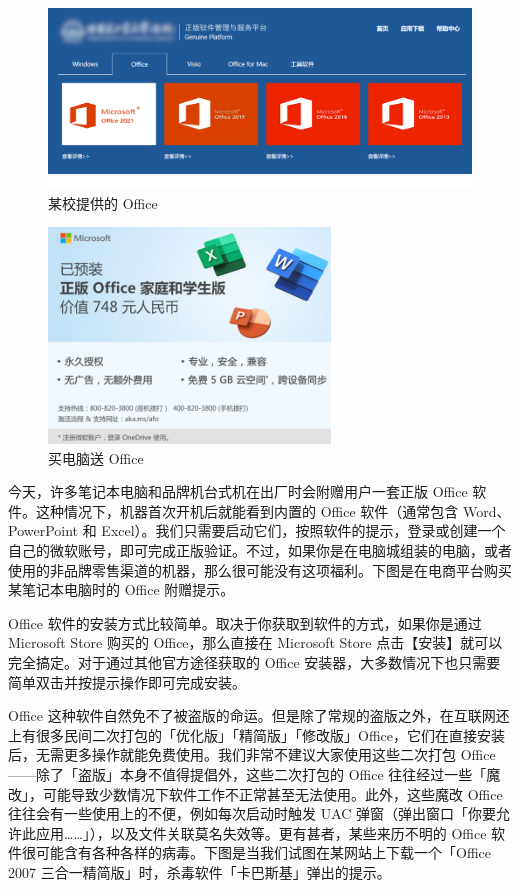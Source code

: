 \begin{figure}[htb!]
  \centering
  \includegraphics[width=12cm]{assets/software/Geniune_platform.png}
  \caption{某校提供的 Office}
  \label{fig:Geniune_platform}
\end{figure}

\begin{figure}[htb!]
  \centering
  \includegraphics[width=7.5cm]{assets/software/Preinstalled_Office.png}
  \caption{买电脑送 Office}
  \label{fig:Preinstalled_Office}
\end{figure}

今天，许多笔记本电脑和品牌机台式机在出厂时会附赠用户一套正版 Office 软件。这种情况下，机器首次开机后就能看到内置的 Office 软件（通常包含 Word、PowerPoint 和 Excel）。我们只需要启动它们，按照软件的提示，登录或创建一个自己的微软账号，即可完成正版验证。不过，如果你是在电脑城组装的电脑，或者使用的非品牌零售渠道的机器，那么很可能没有这项福利。下图是在电商平台购买某笔记本电脑时的 Office 附赠提示。

Office 软件的安装方式比较简单。取决于你获取到软件的方式，如果你是通过 Microsoft Store 购买的 Office，那么直接在 Microsoft Store 点击【安装】就可以完全搞定。对于通过其他官方途径获取的 Office 安装器，大多数情况下也只需要简单双击并按提示操作即可完成安装。

Office 这种软件自然免不了被盗版的命运。但是除了常规的盗版之外，在互联网还上有很多民间二次打包的「优化版」「精简版」「修改版」Office，它们在直接安装后，无需更多操作就能免费使用。我们非常不建议大家使用这些二次打包 Office——除了「盗版」本身不值得提倡外，这些二次打包的 Office 往往经过一些「魔改」，可能导致少数情况下软件工作不正常甚至无法使用。此外，这些魔改 Office 往往会有一些使用上的不便，例如每次启动时触发 UAC 弹窗（弹出窗口「你要允许此应用……」），以及文件关联莫名失效等。更有甚者，某些来历不明的 Office 软件很可能含有各种各样的病毒。下图是当我们试图在某网站上下载一个「Office 2007 三合一精简版」时，杀毒软件「卡巴斯基」弹出的提示。


